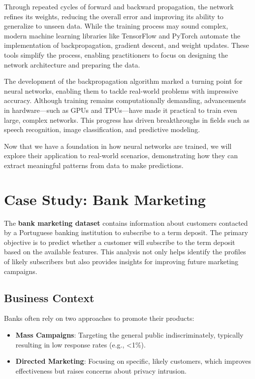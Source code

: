 \documentclass[
]{book}
\providecommand{\tightlist}{%
  \setlength{\itemsep}{0pt}\setlength{\parskip}{0pt}}
\theoremstyle{definition}
\theoremstyle{definition}
\theoremstyle{definition}
\theoremstyle{definition}
\theoremstyle{remark}
\begin{document}
Through repeated cycles of forward and backward propagation, the network refines its weights, reducing the overall error and improving its ability to generalize to unseen data. While the training process may sound complex, modern machine learning libraries like TensorFlow and PyTorch automate the implementation of backpropagation, gradient descent, and weight updates. These tools simplify the process, enabling practitioners to focus on designing the network architecture and preparing the data.

The development of the backpropagation algorithm marked a turning point for neural networks, enabling them to tackle real-world problems with impressive accuracy. Although training remains computationally demanding, advancements in hardware---such as GPUs and TPUs---have made it practical to train even large, complex networks. This progress has driven breakthroughs in fields such as speech recognition, image classification, and predictive modeling.

Now that we have a foundation in how neural networks are trained, we will explore their application to real-world scenarios, demonstrating how they can extract meaningful patterns from data to make predictions.

\section{Case Study: Bank Marketing}\label{case-study-bank-marketing}

The \textbf{bank marketing dataset} contains information about customers contacted by a Portuguese banking institution to subscribe to a term deposit. The primary objective is to predict whether a customer will subscribe to the term deposit based on the available features. This analysis not only helps identify the profiles of likely subscribers but also provides insights for improving future marketing campaigns.

\subsection*{Business Context}\label{business-context}

Banks often rely on two approaches to promote their products:

\begin{itemize}
\tightlist
\item
  \textbf{Mass Campaigns}: Targeting the general public indiscriminately, typically resulting in low response rates (e.g., \textless1\%).\\
\item
  \textbf{Directed Marketing}: Focusing on specific, likely customers, which improves effectiveness but raises concerns about privacy intrusion.
\end{itemize}
\end{document}
